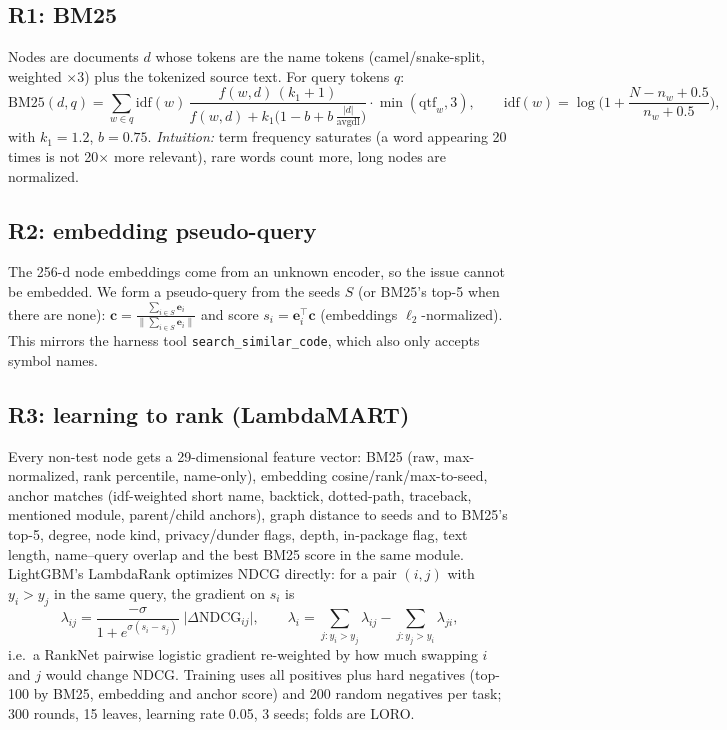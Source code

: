 \documentclass[10pt,a4paper]{article}
\newcommand{\code}[1]{\texttt{#1}}
\newcommand{\1}{\mathbb{1}}
\begin{document}
\subsection{R1: BM25}
Nodes are documents $d$ whose tokens are the name tokens (camel/snake-split, weighted $\times$3) plus the
tokenized source text. For query tokens $q$:
\[
\text{BM25}(d,q)=\sum_{w\in q}\text{idf}(w)\,\frac{f(w,d)\,(k_1+1)}{f(w,d)+k_1\big(1-b+b\,\frac{|d|}{\text{avgdl}}\big)}\cdot\min(\text{qtf}_w,3),
\qquad \text{idf}(w)=\log\Big(1+\frac{N-n_w+0.5}{n_w+0.5}\Big),
\]
with $k_1=1.2$, $b=0.75$. \emph{Intuition:} term frequency saturates (a word appearing 20 times is not 20$\times$
more relevant), rare words count more, long nodes are normalized.

\subsection{R2: embedding pseudo-query}
The 256-d node embeddings come from an unknown encoder, so the issue cannot be embedded. We form a
pseudo-query from the seeds $S$ (or BM25's top-5 when there are none):
$\mathbf c=\frac{\sum_{i\in S}\mathbf e_i}{\|\sum_{i\in S}\mathbf e_i\|}$ and score $s_i=\mathbf e_i^\top\mathbf c$ (embeddings
$\ell_2$-normalized). This mirrors the harness tool \code{search\_similar\_code}, which also only accepts symbol names.

\subsection{R3: learning to rank (LambdaMART)}
Every non-test node gets a 29-dimensional feature vector: BM25 (raw, max-normalized, rank percentile,
name-only), embedding cosine/rank/max-to-seed, anchor matches (idf-weighted short name, backtick,
dotted-path, traceback, mentioned module, parent/child anchors), graph distance to seeds and to BM25's
top-5, degree, node kind, privacy/dunder flags, depth, in-package flag, text length, name--query overlap and
the best BM25 score in the same module. LightGBM's LambdaRank optimizes NDCG directly: for a pair
$(i,j)$ with $y_i>y_j$ in the same query, the gradient on $s_i$ is
\[
\lambda_{ij}=\frac{-\sigma}{1+e^{\sigma(s_i-s_j)}}\;\big|\Delta\text{NDCG}_{ij}\big|,\qquad
\lambda_i=\sum_{j:y_i>y_j}\lambda_{ij}-\sum_{j:y_j>y_i}\lambda_{ji},
\]
i.e.\ a RankNet pairwise logistic gradient re-weighted by how much swapping $i$ and $j$ would change NDCG.
Training uses all positives plus hard negatives (top-100 by BM25, embedding and anchor score) and 200
random negatives per task; 300 rounds, 15 leaves, learning rate 0.05, 3 seeds; folds are LORO.
\end{document}
